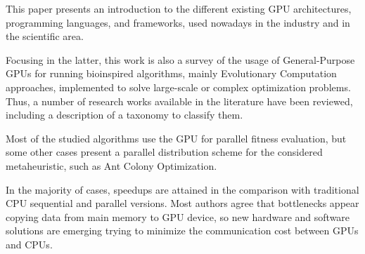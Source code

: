 \documentclass[review]{elsarticle}
\begin{document}
This paper presents an introduction to the different existing GPU architectures, programming languages, and frameworks, used nowadays in the industry and in the scientific area.

Focusing in the latter, this work is also a survey of the usage of General-Purpose GPUs for running bioinspired algorithms, mainly Evolutionary Computation approaches, implemented to solve large-scale or complex optimization problems. Thus, a number of research works available in the literature have been reviewed, including a description of a taxonomy to classify them. 

Most of the studied algorithms use the GPU for parallel fitness evaluation, but some other cases present a parallel distribution scheme for the considered metaheuristic, such as Ant Colony Optimization.

In the majority of cases, speedups are attained in the comparison with
traditional CPU sequential and parallel versions. Most authors agree
that bottlenecks appear copying data from main memory to GPU device,
so new hardware and software solutions are emerging trying to minimize
the communication cost between GPUs and CPUs.







\end{document}
